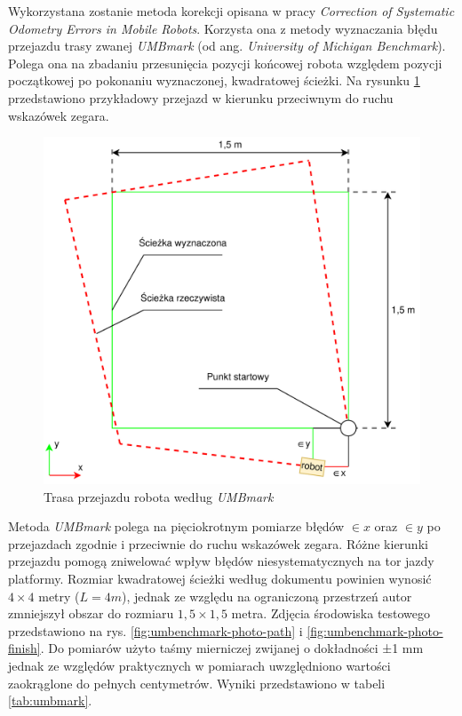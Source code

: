 Wykorzystana zostanie metoda korekcji opisana w pracy \emph{Correction of Systematic Odometry Errors in Mobile Robots}\cite{Borenstein1995}. Korzysta ona z metody wyznaczania błędu przejazdu trasy zwanej \emph{UMBmark} (od ang. \emph{University of Michigan Benchmark}). Polega ona na zbadaniu przesunięcia pozycji końcowej robota względem pozycji początkowej po pokonaniu wyznaczonej, kwadratowej ścieżki. Na rysunku \ref{fig:umbenchmark-path} przedstawiono przykładowy przejazd w kierunku przeciwnym do ruchu wskazówek zegara.

\begin{figure}[ht]
	\centering
		\includegraphics[width=0.8\linewidth]{rys/umbenchmark-path.pdf}
	\caption{Trasa przejazdu robota według \emph{UMBmark}}
	\label{fig:umbenchmark-path}
\end{figure}

Metoda \emph{UMBmark} polega na pięciokrotnym pomiarze błędów $\in{x}$ oraz $\in{y}$ po przejazdach zgodnie i przeciwnie do ruchu wskazówek zegara. Różne kierunki przejazdu pomogą zniwelować wpływ błędów niesystematycznych na tor jazdy platformy. Rozmiar kwadratowej ścieżki według dokumentu powinien wynosić $4\times4$ metry ($L=4m$), jednak ze względu na ograniczoną przestrzeń autor zmniejszył obszar do rozmiaru $1,5\times1,5$ metra. Zdjęcia środowiska testowego przedstawiono na rys. \ref{fig:umbenchmark-photo-path} i  \ref{fig:umbenchmark-photo-finish}. Do pomiarów użyto taśmy mierniczej zwijanej o dokładności ±1 mm jednak ze względów praktycznych w pomiarach uwzględniono wartości zaokrąglone do pełnych centymetrów. Wyniki przedstawiono w tabeli \ref{tab:umbmark}.

